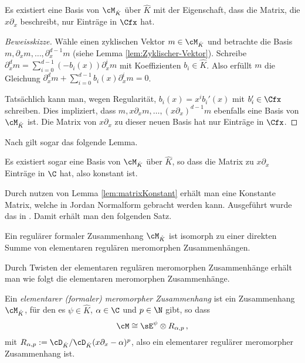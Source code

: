 \begin{lem}
Es existiert eine Basis von $\cM_{\hat K}$ über $\hat K$ mit der Eigenschaft,
dass die Matrix, die $x\partial_x$ beschreibt, nur Einträge in $\Cfx$ hat.
\end{lem}
\begin{comment}
\cite[Lem 5.2.1.]{sabbah_cimpa90}
\end{comment}
\begin{proof}[Beweisskizze] 
Wähle einen zyklischen Vektor $m\in\cM_{\hat K}$ %
 und betrachte die Basis $m,\partial_x m,\dots,\partial_x^{d-1}m$ (siehe Lemma
\ref{lem:Zyklischer-Vektor}).
Schreibe $\partial_x^dm=\sum_{i=0}^{d-1}(-b_i(x))\partial_x^im$ mit
Koeffizienten $b_i\in\hat K$.
Also erfüllt $m$ die Gleichung
$\partial_x^dm+\sum_{i=0}^{d-1}b_i(x)\partial_x^im=0$.
\begin{comment} TODO: bis hier schon klar \end{comment}
Tatsächlich kann man, wegen Regularität, $b_i(x)=x^ib_i'(x)$ mit $b_i'\in \Cfx$
schreiben.
Dies impliziert, dass $m,x\partial_xm,\dots,(x\partial_x)^{d-1}m$ ebenfalls
eine Basis von $\cM_{\hat K}$ ist.
Die Matrix von $x\partial_x$ zu dieser neuen Basis hat nur Einträge in $\Cfx$.
\end{proof}
Nach \cite[Thm 5.2.2]{sabbah_cimpa90} gilt sogar das folgende Lemma.
\begin{lem} \label{lem:matrixKonstant}
Es existiert sogar eine Basis von $\cM_{\hat K}$ über $\hat K$, so dass die
Matrix zu $x\partial_x$ Einträge in $\C$ hat, also konstant ist.
\end{lem}

Durch nutzen von Lemma \ref{lem:matrixKonstant} erhält man eine Konstante
Matrix, welche in Jordan Normalform gebracht werden kann. 
Ausgeführt wurde das in \cite[Cor. 5.2.6]{sabbah_cimpa90}.
Damit erhält man den folgenden Satz.
\begin{thm} \label{thm:regulaerInDirSumme}
Ein regulärer formaler Zusammenhang $\cM_{\hat K}$ ist isomorph zu einer
direkten Summe von elementaren regulären meromorphen Zusammenhängen.
\end{thm}

Durch Twisten der elementaren regulären meromorphen Zusammenhänge erhält man
wie folgt die elementaren meromorphen Zusammenhänge.
\begin{defn} \label{defn:elemMerZsh}
Ein \emph{elementarer (formaler) meromorpher Zusammenhang} ist ein Zusammenhang
$\cM_{\hat K}$, für den es $\psi \in \hat K$, $\alpha\in\C$ und $p\in \N$ gibt,
so dass
\[
\cM\cong \sE^{\psi}\otimes R_{\alpha,p}\,,
\]
mit $R_{\alpha,p}:=\cD_{\hat K}/\cD_{\hat K}(x\partial_x-\alpha)^p$, also ein
elementarer regulärer meromorpher Zusammenhang ist.
\end{defn}

